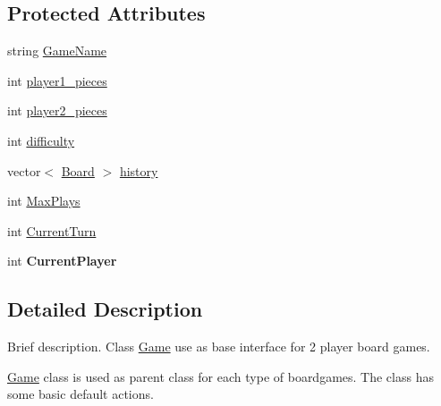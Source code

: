 \subsection*{Protected Attributes}
\begin{DoxyCompactItemize}
\item 
string \hyperlink{class_game_a1b56d5db37d900da0911378cc01f4cad}{Game\-Name}
\item 
int \hyperlink{class_game_aea2c7f8bdb891f32026750c81f6eac16}{player1\-\_\-pieces}
\item 
int \hyperlink{class_game_a2b82ab082220d93bab2d7d1d181ad639}{player2\-\_\-pieces}
\item 
int \hyperlink{class_game_a536a6390d16f05d402928bd731e06ef3}{difficulty}
\item 
vector$<$ \hyperlink{class_board}{Board} $>$ \hyperlink{class_game_a7c0dd74fa2e5c366638596b7e82428f1}{history}
\item 
int \hyperlink{class_game_a53cb9be6604469db6b3abac24c5a2ab6}{Max\-Plays}
\item 
int \hyperlink{class_game_a88700a4643e08b12130ba2950c54ed8b}{Current\-Turn}
\item 
\hypertarget{class_game_a661282d67a0e4a972293c98478bc02e4}{int {\bfseries Current\-Player}}\label{class_game_a661282d67a0e4a972293c98478bc02e4}

\end{DoxyCompactItemize}


\subsection{Detailed Description}
Brief description. Class \hyperlink{class_game}{Game} use as base interface for 2 player board games. 

\hyperlink{class_game}{Game} class is used as parent class for each type of boardgames. The class has some basic default actions. 

